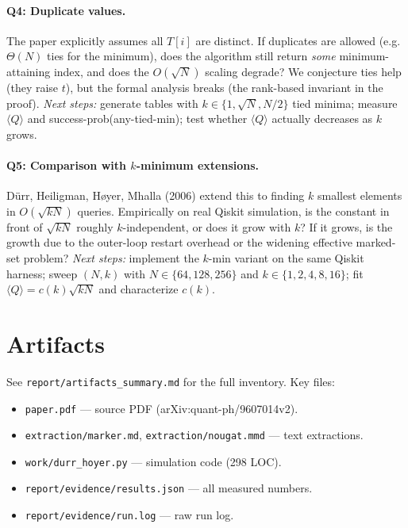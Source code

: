 \documentclass[11pt]{article}
\begin{document}
\paragraph{Q4: Duplicate values.}
The paper explicitly assumes all $T[i]$ are distinct. If duplicates are
allowed (e.g.\ $\Theta(N)$ ties for the minimum), does the algorithm
still return \emph{some} minimum-attaining index, and does the $O(\sqrt{N})$
scaling degrade? We conjecture ties help (they raise $t$), but the
formal analysis breaks (the rank-based invariant in the proof).
\emph{Next steps:} generate tables with $k\in\{1,\sqrt{N},N/2\}$ tied
minima; measure $\langle Q\rangle$ and success-prob(any-tied-min); test
whether $\langle Q\rangle$ actually decreases as $k$ grows.

\paragraph{Q5: Comparison with $k$-minimum extensions.}
Dürr, Heiligman, Høyer, Mhalla (2006) extend this to finding $k$ smallest
elements in $O(\sqrt{kN})$ queries. Empirically on real Qiskit
simulation, is the constant in front of $\sqrt{kN}$ roughly $k$-independent,
or does it grow with $k$? If it grows, is the growth due to the
outer-loop restart overhead or the widening effective marked-set problem?
\emph{Next steps:} implement the $k$-min variant on the same Qiskit
harness; sweep $(N,k)$ with $N\in\{64,128,256\}$ and $k\in\{1,2,4,8,16\}$;
fit $\langle Q\rangle = c(k)\sqrt{kN}$ and characterize $c(k)$.

\section*{Artifacts}
See \texttt{report/artifacts\_summary.md} for the full inventory. Key files:
\begin{itemize}
  \item \texttt{paper.pdf} --- source PDF (arXiv:quant-ph/9607014v2).
  \item \texttt{extraction/marker.md}, \texttt{extraction/nougat.mmd} --- text extractions.
  \item \texttt{work/durr\_hoyer.py} --- simulation code (298 LOC).
  \item \texttt{report/evidence/results.json} --- all measured numbers.
  \item \texttt{report/evidence/run.log} --- raw run log.
\end{itemize}
\end{document}
